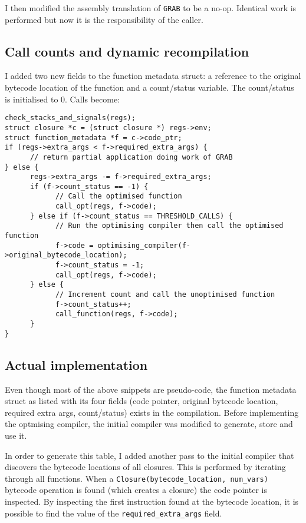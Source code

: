 I then modified the assembly translation of \texttt{GRAB} to be a no-op. Identical work is
performed but now it is the responsibility of the caller.

\subsection{Call counts and dynamic recompilation} \label{final-call-logic}

I added two new fields to the function metadata struct: a reference to the original bytecode
location
of the function and a count/status variable.  The count/status is initialised to 0. Calls become:

\begin{verbatim}
check_stacks_and_signals(regs);
struct closure *c = (struct closure *) regs->env;
struct function_metadata *f = c->code_ptr;
if (regs->extra_args < f->required_extra_args) {
      // return partial application doing work of GRAB
} else { 
      regs->extra_args -= f->required_extra_args;
      if (f->count_status == -1) {
            // Call the optimised function
            call_opt(regs, f->code);
      } else if (f->count_status == THRESHOLD_CALLS) {
            // Run the optimising compiler then call the optimised function
            f->code = optimising_compiler(f->original_bytecode_location);
            f->count_status = -1;
            call_opt(regs, f->code);
      } else {
            // Increment count and call the unoptimised function 
            f->count_status++;
            call_function(regs, f->code);
      }
}
\end{verbatim}

\subsection{Actual implementation}

Even though most of the above snippets are pseudo-code, the function metadata struct as listed with
its four fields (code pointer, original bytecode location, required extra args, count/status)
exists in the compilation. Before implementing the optmising compiler, the initial compiler was
modified to generate, store and use it.

In order to generate this table, I added another pass to the initial compiler that discovers the
bytecode locations of all closures. This is performed by iterating through all functions. When a
\texttt{Closure(bytecode\_location, num\_vars)} bytecode operation is found (which creates a
closure) the code pointer is inspected. By inspecting the first instruction found at the bytecode
location, it is possible to find the value of the \texttt{required\_extra\_args} field.

